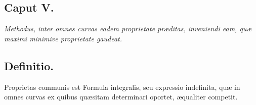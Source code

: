 \subsection*{Caput V.}
\textit{Methodus, inter omnes curvas eadem proprietate præditas, inveniendi eam, quæ maximi minimive proprietate gaudeat.}
\subsection*{Definitio.}
Proprietas communis est Formula integralis, seu expressio indefinita, quæ in omnes curvas ex quibus quæsitam determinari oportet, æqualiter competit.

